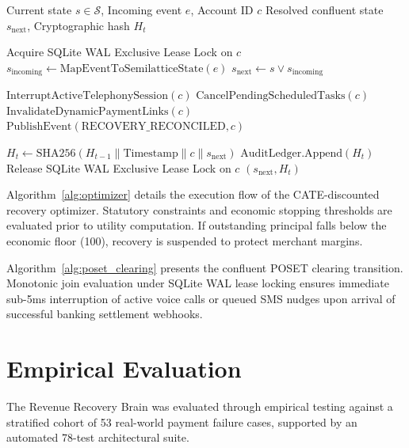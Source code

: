 \documentclass[10pt, twocolumn, a4paper]{article}
\newcommand{\INR}{\text{INR~}}
\begin{document}
\begin{algorithm}[t]
\caption{Confluent POSET Clearing \& Late-Auth Interceptor}
\label{alg:poset_clearing}
\begin{algorithmic}[1]
\Require Current state $s \in \mathcal{S}$, Incoming event $e$, Account ID $c$
\Ensure Resolved confluent state $s_{\text{next}}$, Cryptographic hash $H_t$

\State Acquire SQLite WAL Exclusive Lease Lock on $c$
\State $s_{\text{incoming}} \gets \text{MapEventToSemilatticeState}(e)$
\State $s_{\text{next}} \gets s \vee s_{\text{incoming}}$ 

    \State $\text{InterruptActiveTelephonySession}(c)$ 
    \State $\text{CancelPendingScheduledTasks}(c)$
    \State $\text{InvalidateDynamicPaymentLinks}(c)$
    \State $\text{PublishEvent}(\text{RECOVERY\_RECONCILED}, c)$
\EndIf

\State $H_t \gets \text{SHA256}(H_{t-1} \parallel \text{Timestamp} \parallel c \parallel s_{\text{next}})$
\State $\text{AuditLedger}.\text{Append}(H_t)$
\State Release SQLite WAL Exclusive Lease Lock on $c$
\Return $(s_{\text{next}}, H_t)$
\end{algorithmic}
\end{algorithm}

Algorithm~\ref{alg:optimizer} details the execution flow of the CATE-discounted recovery optimizer. Statutory constraints and economic stopping thresholds are evaluated prior to utility computation. If outstanding principal falls below the economic floor (\INR 100), recovery is suspended to protect merchant margins.

Algorithm~\ref{alg:poset_clearing} presents the confluent POSET clearing transition. Monotonic join evaluation under SQLite WAL lease locking ensures immediate sub-5ms interruption of active voice calls or queued SMS nudges upon arrival of successful banking settlement webhooks.

\section{Empirical Evaluation}

The Revenue Recovery Brain was evaluated through empirical testing against a stratified cohort of 53 real-world payment failure cases, supported by an automated 78-test architectural suite.
\end{document}
